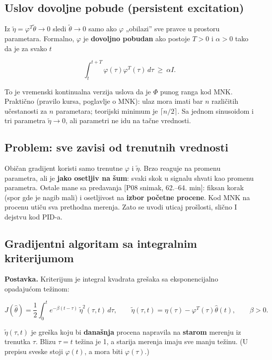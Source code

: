 \documentclass[11pt,a4paper,parskip=half,headsepline,numbers=noenddot]{scrartcl}
\DeclareRobustCommand{\izvor}[1]{{\small\color{izvorC}[#1]}}
\begin{document}
\subsection{Uslov dovoljne pobude (persistent excitation)}

Iz \(\tilde\eta = \varphi^T\tilde\theta \to 0\) sledi \(\tilde\theta \to 0\) samo ako \(\varphi\) „obilazi'' sve pravce u prostoru parametara. Formalno, \(\varphi\) je \textbf{dovoljno pobudan} ako postoje \(T > 0\) i \(\alpha > 0\) tako da je za svako \(t\)

\[\int_t^{t+T}\varphi(\tau)\varphi^T(\tau)\,d\tau \ \ge\ \alpha I .\]

To je vremenski kontinualna verzija uslova da je \(\Phi\) punog ranga kod MNK. Praktično (pravilo kursa, poglavlje o MNK): ulaz mora imati bar \(n\) različitih učestanosti za \(n\) parametara; teorijski minimum je \(\lceil n/2\rceil\). Sa jednom sinusoidom i tri parametra \(\tilde\eta \to 0\), ali parametri ne idu na tačne vrednosti.

\subsection{Problem: sve zavisi od trenutnih vrednosti}

Običan gradijent koristi samo trenutne \(\varphi\) i \(\tilde\eta\). Brzo reaguje na promenu parametra, ali je \textbf{jako osetljiv na šum}: svaki skok u signalu shvati kao promenu parametra. Ostale mane sa predavanja \izvor{P08 snimak, 62.--64. min}: fiksan korak (spor gde je nagib mali) i osetljivost na \textbf{izbor početne procene}. Kod MNK na procenu utiču sva prethodna merenja. Zato se uvodi uticaj prošlosti, slično I dejstvu kod PID-a.

\subsection{Gradijentni algoritam sa integralnim kriterijumom}

\textbf{Postavka.} Kriterijum je integral kvadrata grešaka sa eksponencijalno opadajućom težinom:

\[J(\hat\theta) = \frac12\int_0^te^{-\beta(t-\tau)}\,\tilde\eta^2(\tau, t)\,d\tau,\qquad \tilde\eta(\tau, t) = \eta(\tau) - \varphi^T(\tau)\hat\theta(t),\qquad \beta > 0 .\]

\(\tilde\eta(\tau, t)\) je greška koju bi \textbf{današnja} procena napravila na \textbf{starom} merenju iz trenutka \(\tau\). Blizu \(\tau = t\) težina je 1, a starija merenja imaju sve manju težinu. (U prepisu sveske stoji \(\varphi(t)\), a mora biti \(\varphi(\tau)\).)
\end{document}
